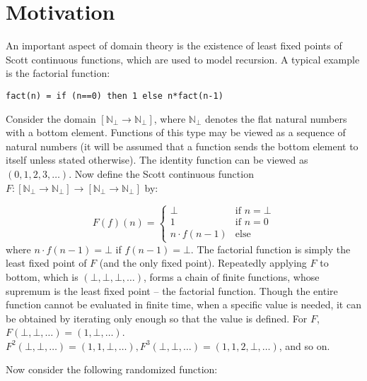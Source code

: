 \section{Motivation} \label{motiv}

An important aspect of domain theory is the existence of least fixed points of Scott continuous functions, which are used to model recursion.  A typical example is the factorial function:

\begin{verbatim}
fact(n) = if (n==0) then 1 else n*fact(n-1)
\end{verbatim}

Consider the domain $[\mathbb{N}_\bot \rightarrow \mathbb{N}_\bot]$, where $\mathbb{N}_\bot$ denotes the flat natural numbers with a bottom element.  Functions of this type may be viewed as a sequence of natural numbers (it will be assumed that a function sends the bottom element to itself unless stated otherwise).  The identity function can be viewed as $(0,1,2,3,\ldots)$.  Now define the Scott continuous function $F:[\mathbb{N}_\bot\rightarrow\mathbb{N}_\bot]\rightarrow[\mathbb{N}_\bot\rightarrow\mathbb{N}_\bot]$ by:

\[
	F(f)(n) = \begin{cases}
		\bot & \text{if } n=\bot \\
		1 & \text{if } n=0 \\
		n \cdot f(n-1) & \text{else}
	\end{cases}
\]
where $n \cdot f(n-1) = \bot$ if $f(n-1) = \bot$.
The factorial function is simply the least fixed point of $F$ (and the only fixed point).  Repeatedly applying $F$ to bottom, which is $(\bot,\bot,\bot,\ldots)$, forms a chain of finite functions, whose supremum is the least fixed point -- the factorial function.  Though the entire function cannot be evaluated in finite time, when a specific value is needed, it can be obtained by iterating only enough so that the value is defined.  For $F$, $F(\bot, \bot, \ldots) = (1, \bot, \ldots)$.  $F^2(\bot, \bot, \ldots) = (1, 1, \bot, \ldots), F^3(\bot, \bot, \ldots) = (1,1,2,\bot, \ldots)$, and so on.

Now consider the following randomized function:

